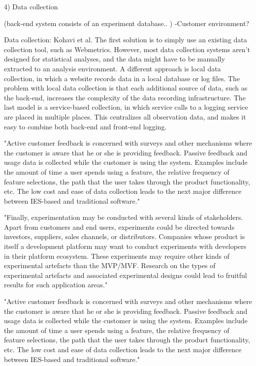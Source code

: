 \documentclass[english]{tktltiki2}
\theoremstyle{definition}
\theoremstyle{remark}
\begin{document}
4) Data collection

(back-end system consists of an experiment database.. ) 
-Customer environment?



Data collection: Kohavi et al.
The first solution is to simply use an existing data collection tool, such as Webmetrics. However, most data collection systems aren't designed for statistical analyses, and the data might have to be manually extracted to an analysis environment. A different approach is local data collection, in which a website records data in a local database or log files. The problem with local data collection is that each additional source of data, such as the back-end, increases the complexity of the data recording infrastructure. The last model is a service-based collection, in which service calls to a logging service are placed in multiple places. This centralizes all observation data, and makes it easy to combine both back-end and front-end logging. 

"Active customer feedback is concerned with surveys and other mechanisms where the customer is aware that he or she is providing feedback. Passive feedback and usage data is collected while the customer is using the system. Examples include the amount of time a user spends using a feature, the relative frequency of feature selections, the path that the user takes through the product functionality, etc. The low cost and ease of data collection leads to the next major difference between IES-based and traditional software." \cite{bosch2012building}


"Finally, experimentation may be conducted with several kinds of stakeholders. Apart from customers and end users, experiments could be directed towards investors, suppliers, sales channels, or distributors. Companies whose product is itself a development platform may want to conduct experiments with developers in their platform ecosystem. These experiments may require other kinds of experimental artefacts than the MVP/MVF. Research on the types of experimental artefacts and associated experimental designs could lead to fruitful results for such application areas."


"Active customer feedback is concerned with surveys and other mechanisms where the customer is aware that he or she is providing feedback. Passive feedback and usage data is collected while the customer is using the system. Examples include the amount of time a user spends using a feature, the relative frequency of feature selections, the path that the user takes through the product functionality, etc. The low cost and ease of data collection leads to the next major difference between IES-based and traditional software." \cite{bosch2012building}
\end{document}
